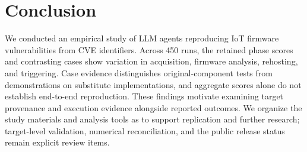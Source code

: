 \section{Conclusion}
We conducted an empirical study of LLM agents reproducing IoT firmware vulnerabilities from CVE identifiers. Across 450 runs, the retained phase scores and contrasting cases show variation in acquisition, firmware analysis, rehosting, and triggering. Case evidence distinguishes original-component tests from demonstrations on substitute implementations, and aggregate scores alone do not establish end-to-end reproduction. These findings motivate examining target provenance and execution evidence alongside reported outcomes. We organize the study materials and analysis tools as \sys{} to support replication and further research; target-level validation, numerical reconciliation, and the public release status remain explicit review items.

